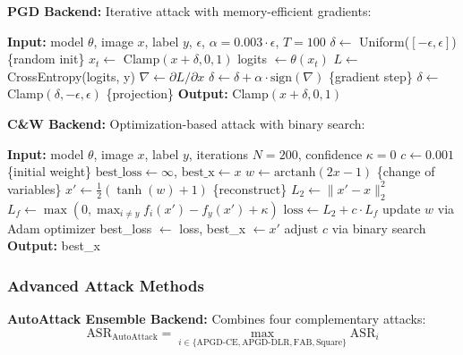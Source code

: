 \documentclass[10pt,conference]{IEEEtran}
\begin{document}
\textbf{PGD Backend:} Iterative attack with memory-efficient gradients:
\begin{algorithm}[h]
\caption{PGD Implementation (Backend)}
\begin{algorithmic}[1]
\STATE \textbf{Input:} model $\theta$, image $x$, label $y$, $\epsilon$, $\alpha=0.003 \cdot \epsilon$, $T=100$
\STATE $\delta \leftarrow$ Uniform($[-\epsilon, \epsilon]$) \quad \{random init\}
\STATE $x_t \leftarrow$ Clamp$(x + \delta, 0, 1)$
\STATE logits $\leftarrow \theta(x_t)$
\STATE $L \leftarrow$ CrossEntropy(logits, y)
\STATE $\nabla \leftarrow \partial L / \partial x$
\STATE $\delta \leftarrow \delta + \alpha \cdot \text{sign}(\nabla)$ \quad \{gradient step\}
\STATE $\delta \leftarrow$ Clamp$(\delta, -\epsilon, \epsilon)$ \quad \{projection\}
\ENDFOR
\STATE \textbf{Output:} Clamp$(x + \delta, 0, 1)$
\end{algorithmic}
\end{algorithm}

\textbf{C\&W Backend:} Optimization-based attack with binary search:
\begin{algorithm}[h]
\caption{C\&W Implementation (Backend)}
\begin{algorithmic}[1]
\STATE \textbf{Input:} model $\theta$, image $x$, label $y$, iterations $N=200$, confidence $\kappa=0$
\STATE $c \leftarrow 0.001$ \quad \{initial weight\}
\STATE $\text{best\_loss} \leftarrow \infty$, $\text{best\_x} \leftarrow x$
\STATE $w \leftarrow \text{arctanh}(2x - 1)$ \quad \{change of variables\}
\STATE $x' \leftarrow \frac{1}{2}(\tanh(w) + 1)$ \quad \{reconstruct\}
\STATE $L_2 \leftarrow \|x' - x\|_2^2$
\STATE $L_f \leftarrow \max(0, \max_{i \neq y} f_i(x') - f_y(x') + \kappa)$
\STATE $\text{loss} \leftarrow L_2 + c \cdot L_f$
\STATE update $w$ via Adam optimizer
\STATE best\_loss $\leftarrow$ loss, best\_x $\leftarrow x'$
\ENDIF
\ENDFOR
\STATE adjust $c$ via binary search
\ENDFOR
\STATE \textbf{Output:} best\_x
\end{algorithmic}
\end{algorithm}

\subsubsection{Advanced Attack Methods}

\textbf{AutoAttack Ensemble Backend:} Combines four complementary attacks:
\begin{equation}
\text{ASR}_{\text{AutoAttack}} = \max_{i \in \{\text{APGD-CE}, \text{APGD-DLR}, \text{FAB}, \text{Square}\}} \text{ASR}_i
\end{equation}
\end{document}
